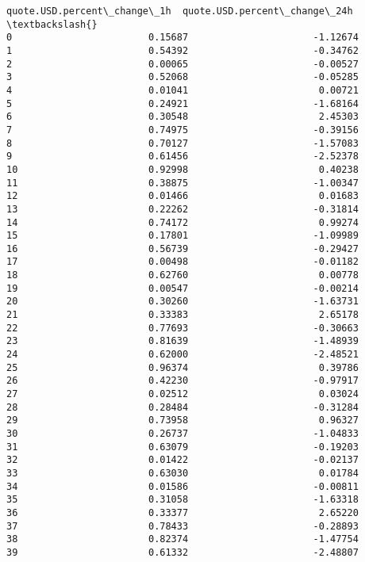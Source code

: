\documentclass[11pt]{article}
\begin{document}
\begin{tcolorbox}[breakable, size=fbox, boxrule=.5pt, pad at break*=1mm, opacityfill=0]
\begin{Verbatim}[commandchars=\\\{\}]
     quote.USD.percent\_change\_1h  quote.USD.percent\_change\_24h  \textbackslash{}
0                        0.15687                      -1.12674
1                        0.54392                      -0.34762
2                        0.00065                      -0.00527
3                        0.52068                      -0.05285
4                        0.01041                       0.00721
5                        0.24921                      -1.68164
6                        0.30548                       2.45303
7                        0.74975                      -0.39156
8                        0.70127                      -1.57083
9                        0.61456                      -2.52378
10                       0.92998                       0.40238
11                       0.38875                      -1.00347
12                       0.01466                       0.01683
13                       0.22262                      -0.31814
14                       0.74172                       0.99274
15                       0.17801                      -1.09989
16                       0.56739                      -0.29427
17                       0.00498                      -0.01182
18                       0.62760                       0.00778
19                       0.00547                      -0.00214
20                       0.30260                      -1.63731
21                       0.33383                       2.65178
22                       0.77693                      -0.30663
23                       0.81639                      -1.48939
24                       0.62000                      -2.48521
25                       0.96374                       0.39786
26                       0.42230                      -0.97917
27                       0.02512                       0.03024
28                       0.28484                      -0.31284
29                       0.73958                       0.96327
30                       0.26737                      -1.04833
31                       0.63079                      -0.19203
32                       0.01422                      -0.02137
33                       0.63030                       0.01784
34                       0.01586                      -0.00811
35                       0.31058                      -1.63318
36                       0.33377                       2.65220
37                       0.78433                      -0.28893
38                       0.82374                      -1.47754
39                       0.61332                      -2.48807

\end{Verbatim}
\end{tcolorbox}
\end{document}
